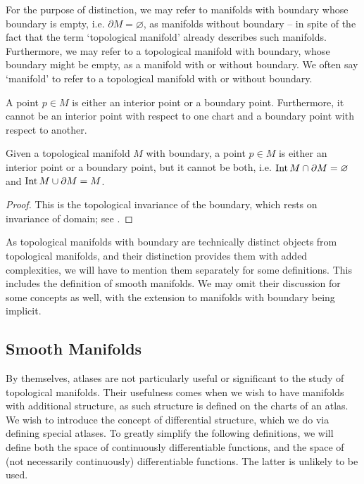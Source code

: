 \documentclass[a4paper,12pt]{article}
\begin{document}
For the purpose of distinction, we may refer to manifolds with boundary whose boundary is empty, i.e. $\partial M = \varnothing$, as manifolds without boundary -- in spite of the fact that the term \enquote*{topological manifold} already describes such manifolds.
Furthermore, we may refer to a topological manifold with boundary, whose boundary might be empty, as a manifold with or without boundary.
We often say \enquote*{manifold} to refer to a topological manifold with or without boundary.

A point $p \in M$ is either an interior point or a boundary point.
Furthermore, it cannot be an interior point with respect to one chart and a boundary point with respect to another.
\begin{proposition}\label{prop:topological_invariance_of_the_boundary}
    Given a topological manifold $M$ with boundary, a point $p \in M$ is either an interior point or a boundary point, but it cannot be both, i.e. $\operatorname{Int} M \cap \partial M = \varnothing$ and $\operatorname{Int} M \cup \partial M = M$.
\end{proposition}
\begin{proof}
    This is the topological invariance of the boundary, which rests on invariance of domain; see \cite[Thm.~1.37]{Lee2012}.
\end{proof}
As topological manifolds with boundary are technically distinct objects from topological manifolds, and their distinction provides them with added complexities, we will have to mention them separately for some definitions.
This includes the definition of smooth manifolds.
We may omit their discussion for some concepts as well, with the extension to manifolds with boundary being implicit.

\subsection{Smooth Manifolds}\label{subsec:manifolds:smooth_manifolds}

By themselves, atlases are not particularly useful or significant to the study of topological manifolds.
Their usefulness comes when we wish to have manifolds with additional structure, as such structure is defined on the charts of an atlas.
We wish to introduce the concept of differential structure, which we do via defining special atlases.
To greatly simplify the following definitions, we will define both the space of continuously differentiable functions, and the space of (not necessarily continuously) differentiable functions.
The latter is unlikely to be used.
\end{document}
